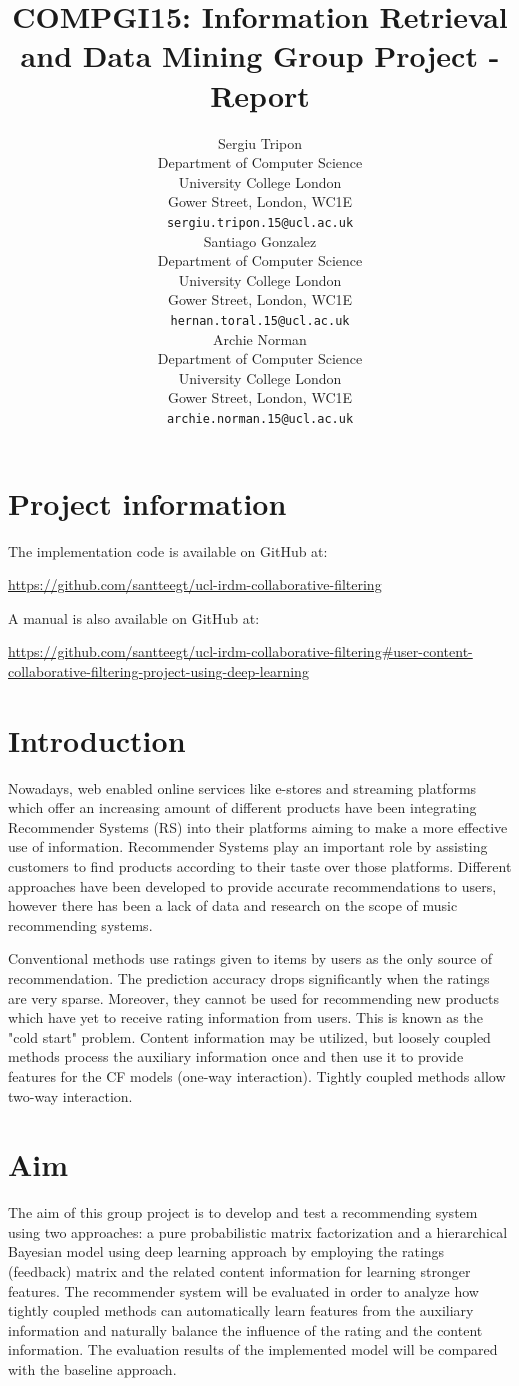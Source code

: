 \documentclass{article} %
\title{COMPGI15: Information Retrieval and Data Mining Group Project - Report}
\author{
Sergiu Tripon\\
Department of Computer Science\\
University College London\\
Gower Street, London, WC1E\\
\texttt{sergiu.tripon.15@ucl.ac.uk}\\
\And
Santiago Gonzalez\\
Department of Computer Science\\
University College London\\
Gower Street, London, WC1E\\
\texttt{hernan.toral.15@ucl.ac.uk} \\
\And
Archie Norman \\
Department of Computer Science\\
University College London\\
Gower Street, London, WC1E\\
\texttt{archie.norman.15@ucl.ac.uk} \\
}
\begin{document}
\maketitle

\section*{Project information}

The implementation code is available on GitHub at:

\url{https://github.com/santteegt/ucl-irdm-collaborative-filtering}

A manual is also available on GitHub at:

\url{https://github.com/santteegt/ucl-irdm-collaborative-filtering#user-content-collaborative-filtering-project-using-deep-learning}

\section{Introduction}

Nowadays, web enabled online services like e-stores and streaming platforms which offer an increasing amount of different products have been integrating Recommender Systems (RS) into their platforms aiming to make a more effective use of information. Recommender Systems play an important role by assisting customers to find products according to their taste over those platforms. Different approaches have been developed to provide accurate recommendations to users, however there has been a lack of data and research on the scope of music recommending systems.

Conventional methods use ratings given to items by users as the only source of recommendation. The prediction accuracy drops significantly when the ratings are very sparse. Moreover, they cannot be used for recommending new products which have yet to receive rating information from users. This is known as the "cold start" problem. Content information may be utilized, but loosely coupled methods process the auxiliary information once and then use it to provide features for the CF models (one-way interaction). Tightly coupled methods allow two-way interaction.

\section{Aim}

The aim of this group project is to develop and test a recommending system using two approaches: a pure probabilistic matrix factorization and a hierarchical Bayesian model using deep learning approach by employing the ratings (feedback) matrix and the related content information for learning stronger features. The recommender system will be evaluated in order to analyze how tightly coupled methods can automatically learn features from the auxiliary information and naturally balance the influence of the rating and the content information. The evaluation results of the implemented model will be compared with the baseline approach.
\end{document}
